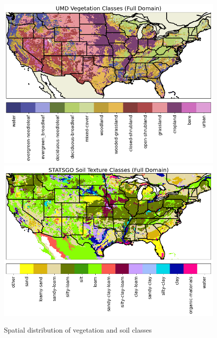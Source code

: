 \begin{figure}[hp!]
    \centering
    \includegraphics[width=.85\linewidth,draft=false]{figures/static_umd-veg-classes.png}
    \includegraphics[width=.85\linewidth,draft=false]{figures/static_statsgo-soil-classes.png}
    \caption{Spatial distribution of vegetation and soil classes}
    \label{static-classes}
\end{figure}

